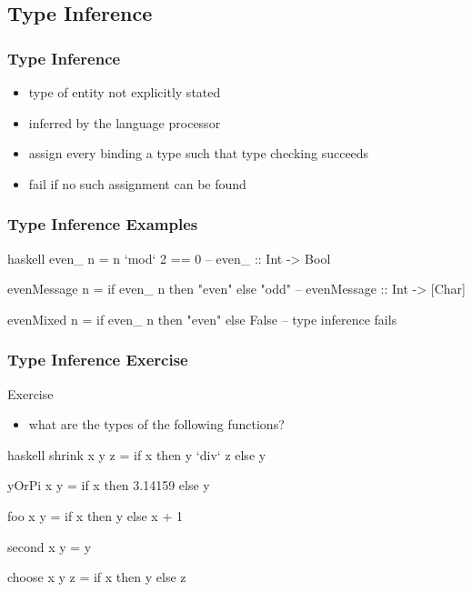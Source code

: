 \documentclass[dvipsnames]{beamer}
\theoremstyle{plain}
\begin{document}
\subsection{Type Inference}

\begin{frame}
  \frametitle{Type Inference}

  \begin{itemize}
    \item type of entity not explicitly stated
    \item inferred by the language processor

    \pause
    \medskip
    \item assign every binding a type such that type checking succeeds
    \item fail if no such assignment can be found
  \end{itemize}
\end{frame}

\begin{frame}[fragile]
  \frametitle{Type Inference Examples}

  \begin{example}[Haskell]
    \begin{pygments}{haskell}
even_ n = n `mod` 2 == 0
-- even_ :: Int -> Bool

evenMessage n = if even_ n then "even" else "odd"
-- evenMessage :: Int -> [Char]

evenMixed n = if even_ n then "even" else False
-- type inference fails
    \end{pygments}
  \end{example}
\end{frame}

\begin{frame}[fragile]
  \frametitle{Type Inference Exercise}

  \begin{block}{Exercise}
    \begin{itemize}
      \item what are the types of the following functions?
    \end{itemize}

    \medskip
    \begin{pygments}{haskell}
shrink x y z = if x then y `div` z else y

yOrPi x y = if x then 3.14159 else y

foo x y = if x then y else x + 1

second x y = y

choose x y z = if x then y else z
    \end{pygments}
  \end{block}
\end{frame}
\end{document}
